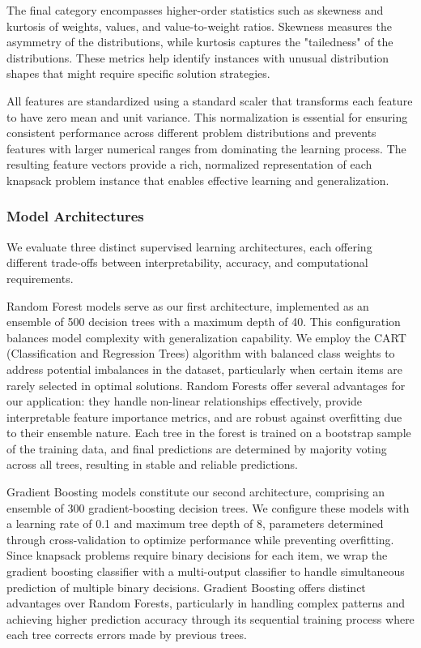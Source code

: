 \documentclass[conference, a4paper]{IEEEtran}
\begin{document}
The final category encompasses higher-order statistics such as skewness and kurtosis of weights, values, and value-to-weight ratios. Skewness measures the asymmetry of the distributions, while kurtosis captures the "tailedness" of the distributions. These metrics help identify instances with unusual distribution shapes that might require specific solution strategies.

All features are standardized using a standard scaler that transforms each feature to have zero mean and unit variance. This normalization is essential for ensuring consistent performance across different problem distributions and prevents features with larger numerical ranges from dominating the learning process. The resulting feature vectors provide a rich, normalized representation of each knapsack problem instance that enables effective learning and generalization.

\subsubsection{Model Architectures}
We evaluate three distinct supervised learning architectures, each offering different trade-offs between interpretability, accuracy, and computational requirements.

Random Forest models serve as our first architecture, implemented as an ensemble of 500 decision trees with a maximum depth of 40. This configuration balances model complexity with generalization capability. We employ the CART (Classification and Regression Trees) algorithm with balanced class weights to address potential imbalances in the dataset, particularly when certain items are rarely selected in optimal solutions. Random Forests offer several advantages for our application: they handle non-linear relationships effectively, provide interpretable feature importance metrics, and are robust against overfitting due to their ensemble nature. Each tree in the forest is trained on a bootstrap sample of the training data, and final predictions are determined by majority voting across all trees, resulting in stable and reliable predictions.

Gradient Boosting models constitute our second architecture, comprising an ensemble of 300 gradient-boosting decision trees. We configure these models with a learning rate of 0.1 and maximum tree depth of 8, parameters determined through cross-validation to optimize performance while preventing overfitting. Since knapsack problems require binary decisions for each item, we wrap the gradient boosting classifier with a multi-output classifier to handle simultaneous prediction of multiple binary decisions. Gradient Boosting offers distinct advantages over Random Forests, particularly in handling complex patterns and achieving higher prediction accuracy through its sequential training process where each tree corrects errors made by previous trees.
\end{document}
